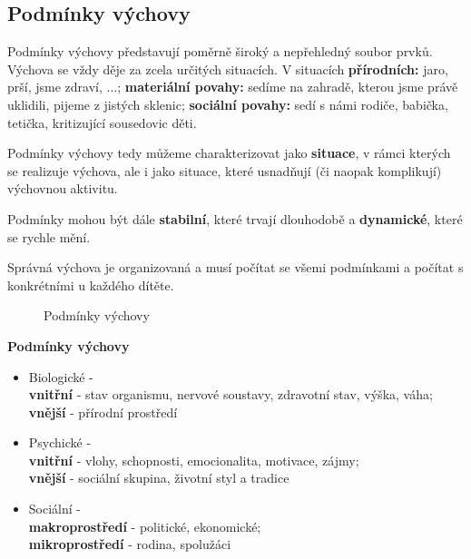 \documentclass[a4paper,12pt,final]{report}
\begin{document}
\subsection*{Podmínky výchovy}
Podmínky výchovy představují poměrně široký a nepřehledný soubor prvků. Výchova se vždy děje za zcela určitých situacích. V situacích \textbf{přírodních:} jaro, prší, jsme zdraví, ...; \textbf{materiální povahy:} sedíme na zahradě, kterou jsme právě uklidili, pijeme z jistých sklenic; \textbf{sociální povahy:} sedí s námi rodiče, babička, tetička, kritizující sousedovic děti.

Podmínky výchovy tedy můžeme charakterizovat jako \textbf{situace}, v rámci kterých se realizuje výchova, ale i jako situace, které usnadňují (či naopak komplikují) výchovnou aktivitu.

Podmínky mohou být dále \textbf{stabilní}, které trvají dlouhodobě a \textbf{dynamické}, které se rychle mění.

Správná výchova je organizovaná a musí počítat se všemi podmínkami a počítat s konkrétními u každého dítěte.

\begin{figure}[ht!]
\centering
{}  
\caption{Podmínky výchovy}
\end{figure}\pagelogos

\begin{samepage}
\textbf{Podmínky výchovy}
\pagelogos
\begin{itemize}
 \item Biologické - \\
    \textbf{vnitřní} - stav organismu, nervové soustavy, zdravotní stav, výška, váha; \\
    \textbf{vnější} - přírodní prostředí
    
 \item Psychické - \\
    \textbf{vnitřní} - vlohy, schopnosti, emocionalita, motivace, zájmy; \\
    \textbf{vnější} - sociální skupina, životní styl a tradice
    
 \item Sociální - \\
    \textbf{makroprostředí} - politické, ekonomické;\\
    \textbf{mikroprostředí} - rodina, spolužáci
\end{itemize}
\end{samepage}
\end{document}
